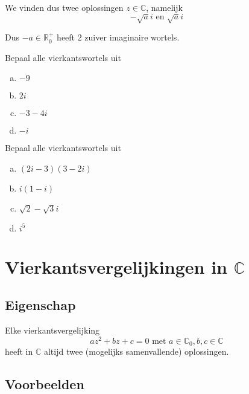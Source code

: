 \documentclass[12pt,twoside,a4]{article}
\begin{document}
We vinden dus twee oplossingen $z\in\mathbb{C}$, namelijk
$$-\sqrt{a}i \mbox{ en } \sqrt{a}i$$

Dus $-a\in\mathbb{R}^+_0$ heeft 2 zuiver imaginaire wortels.


\begin{oefening}
  Bepaal alle vierkantswortels uit
  \begin{multicols}{2}
  \begin{enumerate}[(a)]
    \itemsep 1em
  \item $-9$
  \item $2i$
  \item $-3-4i$
  \item $-i$
  \end{enumerate}
\end{multicols}
\end{oefening}

\begin{oefening}
  Bepaal alle vierkantswortels uit
  \begin{multicols}{2}
  \begin{enumerate}[(a)]
    \itemsep 1em
  \item $(2i-3)(3-2i)$
  \item $i(1-i)$
  \item $\sqrt{2}-\sqrt{3}i$
  \item $i^5$
  \end{enumerate}
\end{multicols}
\end{oefening}

\pagebreak
\section{Vierkantsvergelijkingen in $\mathbb{C}$}

\subsection{Eigenschap}

\begin{mdframed}
Elke vierkantsvergelijking
\[az^2+bz+c=0 \text{ met } a\in\mathbb{C}_0, b,c\in\mathbb{C}\]
heeft in $\mathbb{C}$ altijd twee (mogelijks samenvallende) oplossingen.
\end{mdframed}

\subsection{Voorbeelden}
\end{document}
